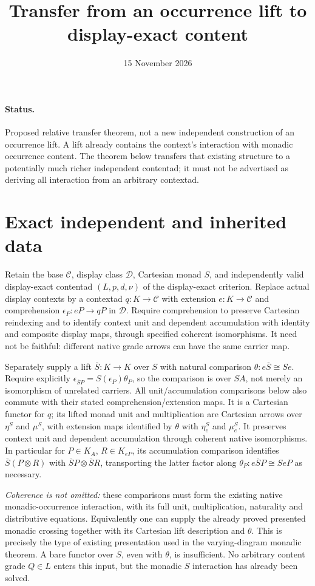 \documentclass[11pt]{article}
\title{Transfer from an occurrence lift to display-exact content}
\date{15 November 2026}
\begin{document}
\maketitle
\paragraph{Status.} Proposed relative transfer theorem, not a new independent construction of an occurrence lift. A lift already contains the context's interaction with monadic occurrence content. The theorem below transfers that existing structure to a potentially much richer independent contentad; it must not be advertised as deriving all interaction from an arbitrary contextad.

\section{Exact independent and inherited data}
Retain the base $\mathcal C$, display class $\mathcal D$, Cartesian monad $S$, and independently valid display-exact contentad $(L,p,d,\nu)$ of the display-exact criterion. Replace actual display contexts by a contextad $q:K\to\mathcal C$ with extension $e:K\to\mathcal C$ and comprehension $\epsilon_P:eP\to qP$ in $\mathcal D$. Require comprehension to preserve Cartesian reindexing and to identify context unit and dependent accumulation with identity and composite display maps, through specified coherent isomorphisms. It need not be faithful: different native grade arrows can have the same carrier map.

Separately supply a lift $\overline S:K\to K$ over $S$ with natural comparison $\theta:e\overline S\cong Se$. Require explicitly $\epsilon_{\overline SP}=S(\epsilon_P)\theta_P$, so the comparison is over $SA$, not merely an isomorphism of unrelated carriers. All unit/accumulation comparisons below also commute with their stated comprehension/extension maps. It is a Cartesian functor for $q$; its lifted monad unit and multiplication are Cartesian arrows over $\eta^S$ and $\mu^S$, with extension maps identified by $\theta$ with $\eta^S_e$ and $\mu^S_e$. It preserves context unit and dependent accumulation through coherent native isomorphisms. In particular for $P\in K_A$, $R\in K_{eP}$, its accumulation comparison identifies $\overline S(P\otimes R)$ with $\overline SP\otimes\overline SR$, transporting the latter factor along $\theta_P:e\overline SP\cong SeP$ as necessary.

\emph{Coherence is not omitted:} these comparisons must form the existing native monadic-occurrence interaction, with its full unit, multiplication, naturality and distributive equations. Equivalently one can supply the already proved presented monadic crossing together with its Cartesian lift description and $\theta$. This is precisely the type of existing presentation used in the varying-diagram monadic theorem. A bare functor over $S$, even with $\theta$, is insufficient. No arbitrary content grade $Q\in L$ enters this input, but the monadic $S$ interaction has already been solved.
\end{document}
